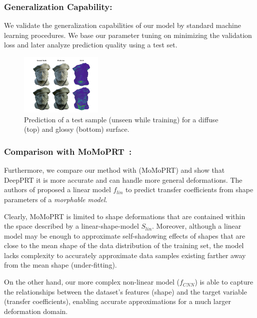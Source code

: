 \subsubsection*{Generalization Capability:}
We validate the generalization capabilities of our model by standard machine learning procedures. We base our parameter tuning on minimizing the validation loss and later analyze prediction quality using a test set.
\begin{figure}[H]
  \centering
    \includegraphics[width=0.35\textwidth]{Figures/glossy_pirate.pdf}
     \caption{Prediction of a test sample (unseen while training) for a diffuse (top) and glossy (bottom) surface. }
     \label{Fig: glossy_pirate}
\end{figure}
\subsubsection*{\textbf{Comparison with MoMoPRT}~:}
Furthermore, we compare our method with \cite{MoMoPRT} (MoMoPRT) and show that DeepPRT it is more accurate and can handle more general deformations. 
The authors of \cite{MoMoPRT} proposed a linear model $f_{lin}$ to predict transfer coefficients from shape parameters of a \textit{morphable model}.

Clearly, MoMoPRT is limited to shape deformations that are contained within the space described by a linear-shape-model $S_{lin}$. Moreover, although a linear model may be enough to approximate self-shadowing effects of shapes that are close to the mean shape of the data distribution of the training set, the model lacks complexity to accurately approximate data samples existing farther away from the mean shape (under-fitting).  

On the other hand, our more complex non-linear model ($f_{CNN}$) is able to capture the relationships between the dataset's features (shape) and the target variable (transfer coefficients), enabling accurate approximations for a much larger deformation domain.

